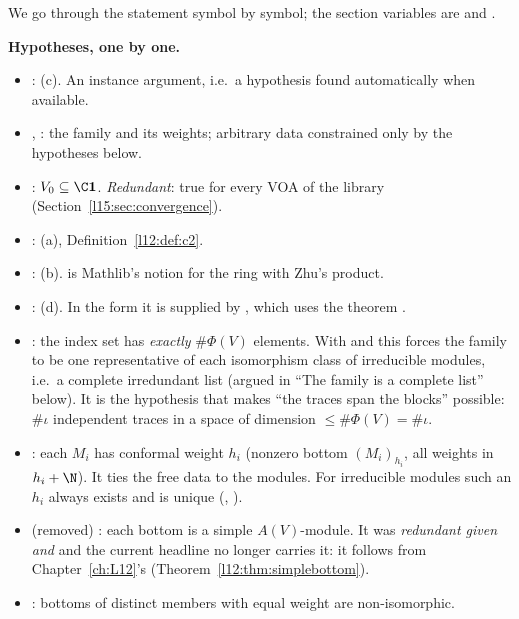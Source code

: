 \begin{dictionary}
We go through the statement symbol by symbol; the section variables are
 and
.

\textbf{Hypotheses, one by one.}
\begin{itemize}
\item \lean{[Finite (Φ W)]}: (c). An instance argument, i.e.\ a hypothesis found automatically when available.
\item {}, : the family and its weights; arbitrary data constrained only by the hypotheses below.
\item {}: $V_0\subseteq\C\lfifteenvac$. \emph{Redundant}: true for every VOA of the library
  (Section~\ref{l15:sec:convergence}).
\item {}: (a), Definition~\ref{l12:def:c2}.
\item {}: (b).  is Mathlib's notion for the ring  with Zhu's product.
\item {}: (d). In the  form it is supplied by , which uses the theorem .
\item {}: the index set has \emph{exactly} $\#\Phi(V)$ elements. With 
  and  this forces the family to be one representative of each isomorphism class of irreducible modules, i.e.\ a
  complete irredundant list (argued in ``The family is a complete list'' below). It is the hypothesis that makes
  ``the traces span the blocks'' possible: $\#\iota$ independent traces in a space of dimension $\le\#\Phi(V)=\#\iota$.
\item {}: each $M_i$ has conformal weight $h_i$ (nonzero bottom $(M_i)_{h_i}$, all weights in $h_i+\N$).
  It ties the free data  to the modules. For irreducible modules such an $h_i$ always exists and is unique
  (\allowbreak{}, ).
\item (removed) : each bottom is a simple $A(V)$-module. It was \emph{redundant given  and } and the
  current headline no longer carries it: it follows from
  Chapter~\ref{ch:L12}'s \allowbreak{}\allowbreak{} (Theorem~\ref{l12:thm:simplebottom}).
\item {}: bottoms of distinct members with equal weight are non-isomorphic.
\end{itemize}


\end{dictionary}
